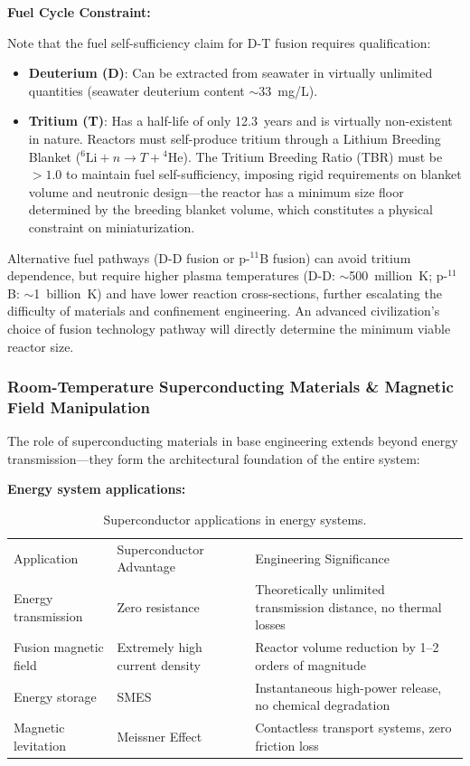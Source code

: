 \documentclass[aps,prd,twocolumn,superscriptaddress,nofootinbib]{revtex4-2}
\begin{document}
\textbf{Fuel Cycle Constraint:}

Note that the fuel self-sufficiency claim for D-T fusion requires qualification:

\begin{itemize}
  \item \textbf{Deuterium (D)}: Can be extracted from seawater in virtually unlimited quantities (seawater deuterium content ${\sim}$\SI{33}{mg/L}).
  \item \textbf{Tritium (T)}: Has a half-life of only \SI{12.3}{years} and is virtually non-existent in nature. Reactors must self-produce tritium through a Lithium Breeding Blanket (${}^{6}\text{Li} + n \to T + {}^{4}\text{He}$). The Tritium Breeding Ratio (TBR) must be $>1.0$ to maintain fuel self-sufficiency, imposing rigid requirements on blanket volume and neutronic design---the reactor has a minimum size floor determined by the breeding blanket volume, which constitutes a physical constraint on miniaturization.
\end{itemize}

Alternative fuel pathways (D-D fusion or p-${}^{11}$B fusion) can avoid tritium dependence, but require higher plasma temperatures (D-D: ${\sim}$\SI{500}{million~K}; p-${}^{11}$B: ${\sim}$\SI{1}{billion~K}) and have lower reaction cross-sections, further escalating the difficulty of materials and confinement engineering. An advanced civilization's choice of fusion technology pathway will directly determine the minimum viable reactor size.

\subsubsection{Room-Temperature Superconducting Materials \& Magnetic Field Manipulation}\label{sec:room-temp-sc}

The role of superconducting materials in base engineering extends beyond energy transmission---they form the architectural foundation of the entire system:

\textbf{Energy system applications:}

\begin{table}[htbp]
\caption{Superconductor applications in energy systems.}
\label{tab:superconductor-apps}
\begin{ruledtabular}
\begin{tabular}{lll}
Application & Superconductor Advantage & Engineering Significance \\
\colrule
Energy transmission & Zero resistance & Theoretically unlimited transmission distance, no thermal losses \\
Fusion magnetic field & Extremely high current density & Reactor volume reduction by 1--2 orders of magnitude \\
Energy storage & SMES & Instantaneous high-power release, no chemical degradation \\
Magnetic levitation & Meissner Effect & Contactless transport systems, zero friction loss \\
\end{tabular}
\end{ruledtabular}
\end{table}
\end{document}
